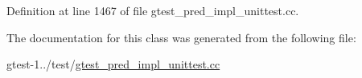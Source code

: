 \-Definition at line 1467 of file gtest\-\_\-pred\-\_\-impl\-\_\-unittest.\-cc.



\-The documentation for this class was generated from the following file\-:\begin{DoxyCompactItemize}
\item 
gtest-\/1../test/\hyperlink{gtest__pred__impl__unittest_8cc}{gtest\-\_\-pred\-\_\-impl\-\_\-unittest.\-cc}\end{DoxyCompactItemize}
